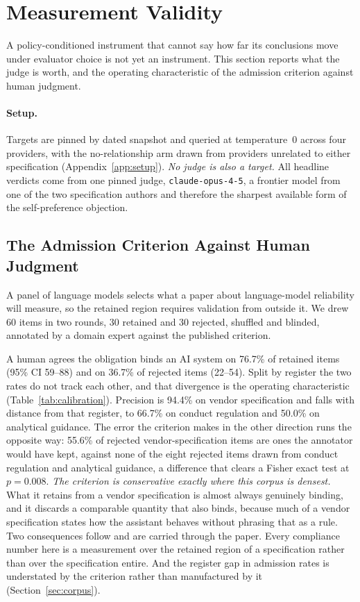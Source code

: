 \documentclass{article}
\begin{document}
\section{Measurement Validity}
\label{sec:validity}

A policy-conditioned instrument that cannot say how far its conclusions move under evaluator
choice is not yet an instrument. This section reports what the judge is worth, and the operating
characteristic of the admission criterion against human judgment.

\paragraph{Setup.}
Targets are pinned by dated snapshot and queried at temperature~0 across four providers, with
the no-relationship arm drawn from providers unrelated to either specification
(Appendix~\ref{app:setup}). \emph{No judge is also a target.} All headline verdicts come from
one pinned judge, \texttt{claude-opus-4-5}, a frontier model from one of the two specification
authors and therefore the sharpest available form of the self-preference objection.

\subsection{The Admission Criterion Against Human Judgment}
\label{sec:calibration}

A panel of language models selects what a paper about language-model reliability will measure,
so the retained region requires validation from outside it. We drew 60 items in two rounds, 30
retained and 30 rejected, shuffled and blinded, annotated by a domain expert against the
published criterion.

A human agrees the obligation binds an AI system on 76.7\% of retained items (95\% CI 59--88)
and on 36.7\% of rejected items (22--54). Split by register the two rates do not track each
other, and that divergence is the operating characteristic
(Table~\ref{tab:calibration}). Precision is 94.4\% on vendor specification and falls with
distance from that register, to 66.7\% on conduct regulation and 50.0\% on analytical guidance.
The error the criterion makes in the other direction runs the opposite way: 55.6\% of rejected
vendor-specification items are ones the annotator would have kept, against none of the eight
rejected items drawn from conduct regulation and analytical guidance, a difference that clears a
Fisher exact test at $p = 0.008$. \emph{The criterion is conservative exactly where this corpus
is densest.} What it retains from a vendor specification is almost always genuinely binding, and
it discards a comparable quantity that also binds, because much of a vendor specification states
how the assistant behaves without phrasing that as a rule. Two consequences follow and are
carried through the paper. Every compliance number here is a measurement over the retained
region of a specification rather than over the specification entire. And the register gap in
admission rates is understated by the criterion rather than manufactured by it
(Section~\ref{sec:corpus}).
\end{document}
